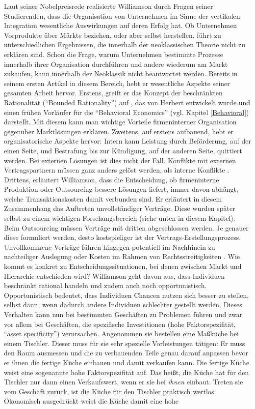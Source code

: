 Laut seiner Nobelpreisrede \textcite{Williamson2009} realisierte Williamson durch Fragen seiner Studierenden, dass die Organisation von Unternehmen im Sinne der vertikalen Integration wesentliche Auswirkungen auf deren Erfolg hat. Ob Unternehmen Vorprodukte über Märkte beziehen, oder aber selbst herstellen, führt zu unterschiedlichen Ergebnissen, die innerhalb der neoklassischen Theorie nicht zu erklären sind. Schon die Frage, warum Unternehmen bestimmte Prozesse innerhalb ihrer Organisation durchführen und andere wiederum am Markt zukaufen, kann innerhalb der Neoklassik nicht beantwortet werden. Bereits in seinem ersten Artikel in diesem Bereich, hebt er wesentliche Aspekte seiner gesamten Arbeit hervor. Erstens, greift er das Konzept der beschränkten Rationalität ("`Bounded Rationality"') auf \parencite[S. 113]{Williamson1971}, das von Herbert \textcite{Simon1955} entwickelt wurde und einen frühen Vorläufer für die "`Behavioral Economics"' (vgl. Kapitel \ref{Behavioral}) darstellt. Mit diesem kann man wichtige Vorteile firmeninterner Organisation gegenüber Marktlösungen erklären. Zweitens, auf erstens aufbauend, hebt er organisatorische Aspekte hervor: Intern kann Leistung durch Beförderung, auf der einen Seite, und Bestrafung bis zur Kündigung, auf der anderen Seite, quittiert werden. Bei externen Lösungen ist dies nicht der Fall. Konflikte mit externen Vertragspartnern müssen ganz anders gelöst werden, als interne Konflikte \parencite[S. 113f]{Williamson1971}. Drittens, erläutert Williamson, dass die Entscheidung, ob firmeninterne Produktion oder Outsourcing bessere Lösungen liefert, immer davon abhängt, welche Transaktionskosten damit verbunden sind. Er erläutert in diesem Zusammenhang das Auftreten unvollständiger Verträge. Diese wurden später selbst zu einem wichtigen Forschungsbereich (siehe unten in diesem Kapitel). Beim Outsourcing müssen Verträge mit dritten abgeschlossen werden. Je genauer diese formuliert werden, desto kostspieliger ist der Vertrags-Erstellungsprozess. Unvollkommene Verträge führen hingegen potentiell im Nachhinein zu nachteiliger Auslegung oder Kosten im Rahmen von Rechtsstreitigkeiten \parencite[S. 117]{Williamson1971}. Wie kommt es konkret zu Entscheidungssituationen, bei denen zwischen Markt und Hierarchie entschieden wird? Williamson geht davon aus, dass Individuen beschränkt rational handeln und zudem auch noch opportunistisch. Opportunistisch bedeutet, dass Individuen Chancen nutzen sich besser zu stellen, selbst dann, wenn dadurch andere Individuen schlechter gestellt werden. Dieses Verhalten kann nun bei bestimmten Geschäften zu Problemen führen und zwar vor allem bei Geschäften, die spezifische Investitionen (hohe Faktorspezifität, "`asset specificity"') verursachen. Angenommen sie bestellen eine Maßküche bei einem Tischler. Dieser muss für sie sehr spezielle Vorleistungen tätigen: Er muss den Raum ausmessen und die zu verbauenden Teile genau darauf anpassen bevor er ihnen die fertige Küche einbauen und damit verkaufen kann. Die fertige Küche weist eine sogenannte hohe Faktorspezifität auf. Das heißt, die Küche hat für den Tischler nur dann einen Verkaufswert, wenn er sie bei \textit{ihnen} einbaut. Treten sie vom Geschäft zurück, ist die Küche für den Tischler praktisch wertlos. Ökonomisch ausgedrückt weist die Küche damit eine hohe 